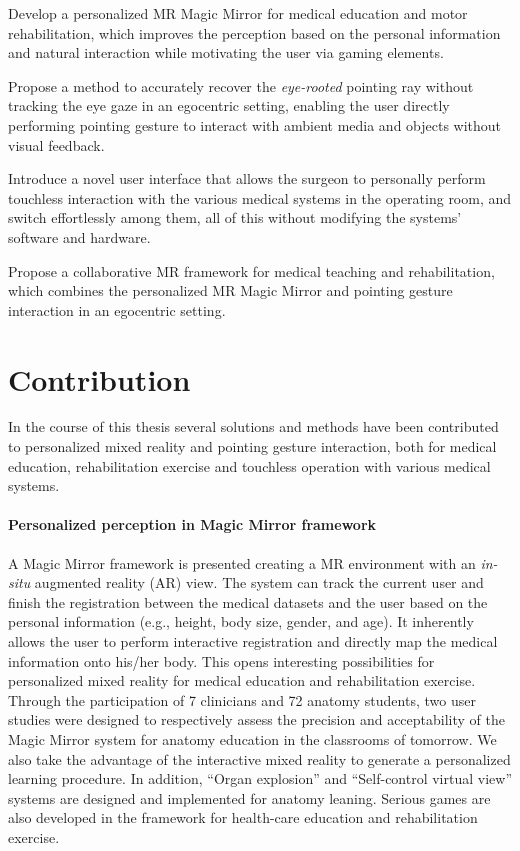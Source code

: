\begin{description} [font=$\bullet$\scshape\bfseries]
	\item Develop a personalized MR Magic Mirror for medical education and motor rehabilitation, which improves the perception based on the personal information and natural interaction while motivating the user via gaming elements.%
	\item Propose a method to accurately recover the \textit{eye-rooted} pointing ray without tracking the eye gaze in an egocentric setting, enabling the user directly performing pointing gesture to interact with ambient media and objects without visual feedback.
	\item Introduce a novel user interface that allows the surgeon to personally perform touchless interaction with the various medical systems in the operating room, and switch effortlessly among them, all of this without modifying the systems' software and hardware.
	\item Propose a collaborative MR framework for medical teaching and rehabilitation, which combines the personalized MR Magic Mirror and pointing gesture interaction in an egocentric setting. 
\end{description}

\section{Contribution}
In the course of this thesis several solutions and methods have been contributed to personalized mixed reality and pointing gesture interaction, both for medical education, rehabilitation exercise and touchless operation with various medical systems.

\paragraph{Personalized perception in Magic Mirror framework}
A Magic Mirror framework is presented creating a MR environment with an \textit{in-situ} augmented reality (AR) view. The system can track the current user and finish the registration between the medical datasets and the user based on the personal information (e.g., height, body size, gender, and age). It inherently allows the user to perform interactive registration and directly map the medical information onto his/her body. This opens interesting possibilities for personalized mixed reality for medical education and rehabilitation exercise. Through the participation of 7 clinicians and 72 anatomy students, two user studies were designed to respectively assess the precision and acceptability of the Magic Mirror system for anatomy education in the classrooms of tomorrow. We also take the advantage of the interactive mixed reality to generate a personalized learning procedure. In addition, ``Organ explosion'' and ``Self-control virtual view'' systems are designed and implemented for anatomy leaning. Serious games are also developed in the framework for health-care education and rehabilitation exercise.

